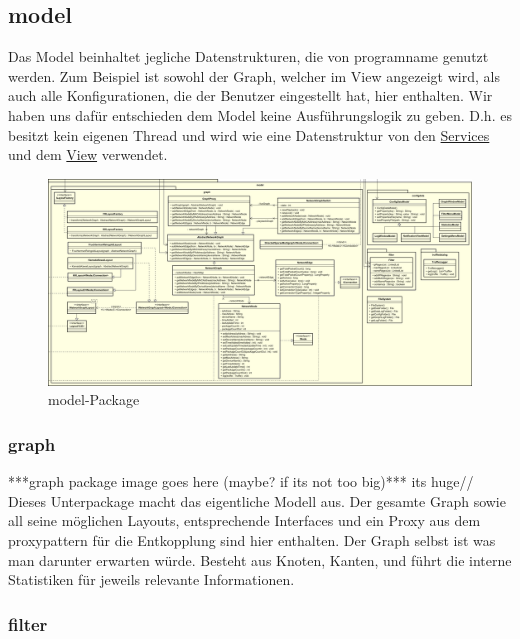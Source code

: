 \subsection{model}
\label{subsec:model}

Das Model beinhaltet jegliche Datenstrukturen, die von \gls{programname} genutzt
werden. Zum Beispiel ist sowohl der Graph, welcher im View angezeigt wird,
als auch alle Konfigurationen, die der Benutzer eingestellt hat, hier enthalten. Wir haben uns
dafür entschieden dem Model keine Ausführungslogik zu geben.
D.h. es besitzt kein eigenen Thread und wird wie eine Datenstruktur von den
\hyperref[subsec:service]{Services} und dem \hyperref[subsec:view]{View} verwendet.

\begin{figure}[H]
  \centering
  \includegraphics[width=\textwidth]{../diagramimages/model.png}
  \caption{model-Package}
\end{figure}

    \subsubsection{graph}
    \label{subsubsec:graph}
    ***graph package image goes here (maybe? if its not too big)*** its huge//
    \newline
    \newline
    Dieses Unterpackage macht das eigentliche Modell aus. Der gesamte Graph sowie
    all seine möglichen Layouts, entsprechende Interfaces und ein Proxy aus dem
    \gls{proxypattern} für die Entkopplung sind hier enthalten. Der Graph selbst ist was man darunter erwarten würde.
    Besteht aus Knoten, Kanten, und führt die interne Statistiken für jeweils relevante Informationen.

    \subsubsection{filter}
    \label{subsubsec:filter}

